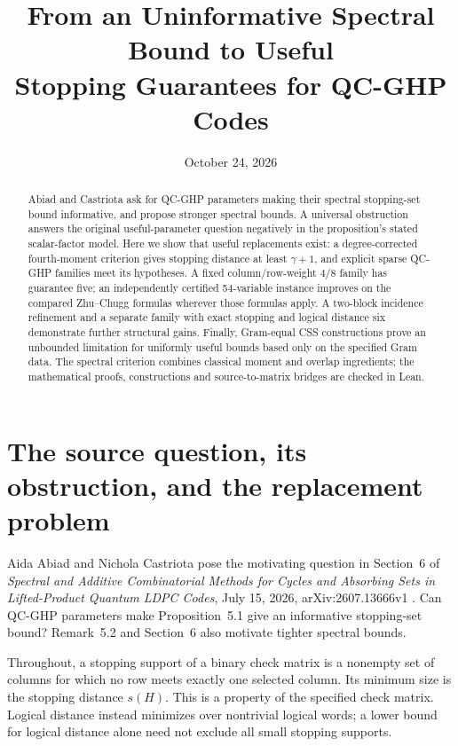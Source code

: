 \documentclass[11pt]{article}
\title{From an Uninformative Spectral Bound to Useful\\Stopping Guarantees for QC-GHP Codes}
\author{}
\date{October 24, 2026}
\begin{document}
\maketitle
\begin{abstract}
Abiad and Castriota ask for QC-GHP parameters making their spectral stopping-set
bound informative, and propose stronger spectral bounds. A universal
obstruction answers the original useful-parameter question negatively in the
proposition's stated scalar-factor model. Here we show that useful replacements
exist: a degree-corrected fourth-moment criterion gives stopping distance at least
$\gamma+1$, and explicit sparse QC-GHP families meet its hypotheses. A fixed
column/row-weight $4/8$ family has guarantee five; an independently certified
54-variable instance improves on the compared Zhu--Chugg formulas wherever those
formulas apply. A two-block incidence refinement and a separate family with exact
stopping and logical distance six demonstrate further structural gains. Finally,
Gram-equal CSS constructions prove an unbounded limitation for uniformly useful
bounds based only on the specified Gram data. The spectral criterion combines
classical moment and overlap ingredients; the mathematical proofs, constructions and
source-to-matrix bridges are checked in Lean.
\end{abstract}

\section{The source question, its obstruction, and the replacement problem}
\label{sec:question}
Aida Abiad and Nichola Castriota pose the motivating question in Section~6 of
\emph{Spectral and Additive Combinatorial Methods for Cycles and Absorbing Sets
in Lifted-Product Quantum LDPC Codes}, July 15, 2026, arXiv:2607.13666v1 \cite{ref1}.
Can QC-GHP parameters make Proposition~5.1 give an informative stopping-set
bound? Remark~5.2 and Section~6 also motivate tighter spectral bounds.

Throughout, a stopping support of a binary check matrix is a nonempty set of
columns for which no row meets exactly one selected column. Its minimum size is
the stopping distance $s(H)$. This is a property of the specified check matrix.
Logical distance instead minimizes over nontrivial logical words; a lower bound
for logical distance alone need not exclude all small stopping supports.
\end{document}
